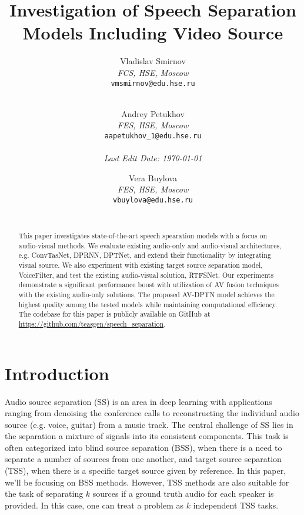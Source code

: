 \documentclass[10pt,conference,compsocconf]{IEEEtran}
\begin{document}
\title{Investigation of Speech Separation Models Including Video Source}

\author{
  Vladislav Smirnov\\
  \textit{FCS, HSE, Moscow}\\
  \texttt{vmsmirnov@edu.hse.ru}\\ \ \\
  \and
  Andrey Petukhov\\
  \textit{FES, HSE, Moscow}\\
  \texttt{aapetukhov\_1@edu.hse.ru}\\ \ \\
  \textit{Last Edit Date: \today}
  \and
  Vera Buylova\\
  \textit{FES, HSE, Moscow}\\
  \texttt{vbuylova@edu.hse.ru}\\ \ \\
}

\maketitle

\begin{abstract}
  This paper investigates state-of-the-art speech spearation models with a focus on audio-visual methods. We evaluate existing audio-only and audio-visual architectures, e.g. ConvTasNet, DPRNN, DPTNet, and extend their functionality by integrating visual source. We also experiment with existing target source separation model, VoiceFilter, and test the existing audio-visual solution, RTFSNet. Our experiments demonstrate a significant performance boost with utilization of AV fusion techniques with the existing audio-only solutions. The proposed AV-DPTN model achieves the highest quality among the tested models while maintaining computational efficiency. The codebase for this paper is publicly available on GitHub at \url{https://github.com/teasgen/speech_separation}.
\end{abstract}

\section{Introduction}\label{sec:introduction}

Audio source separation (SS) is an area in deep learning with applications ranging from denoising the conference calls to reconstructing the individual audio source (e.g. voice, guitar) from a music track. The central challenge of SS lies in the separation a mixture of signals into its consistent components. This task is often categorized into blind source separation (BSS), when there is a need to separate a number of sources from one another, and target source separation (TSS), when there is a specific target source given by reference. In this paper, we'll be focusing on BSS methods. However, TSS methods are also suitable for the task of separating $\mathit{k}$ sources if a ground truth audio for each speaker is provided. In this case, one can treat a problem as $\mathit{k}$ independent TSS tasks. 
\end{document}
